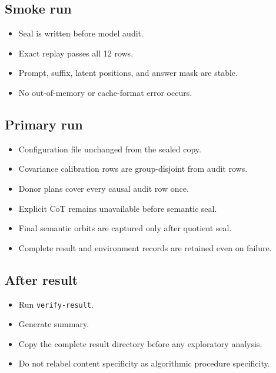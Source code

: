 \documentclass[
  10pt,
]{article}
\providecommand{\tightlist}{%
  \setlength{\itemsep}{0pt}\setlength{\parskip}{0pt}}
\begin{document}
\subsection{Smoke run}\label{smoke-run}

\begin{itemize}
\tightlist
\item[$\square$]
  Seal is written before model audit.
\item[$\square$]
  Exact replay passes all 12 rows.
\item[$\square$]
  Prompt, suffix, latent positions, and answer mask are stable.
\item[$\square$]
  No out-of-memory or cache-format error occurs.
\end{itemize}

\subsection{Primary run}\label{primary-run}

\begin{itemize}
\tightlist
\item[$\square$]
  Configuration file unchanged from the sealed copy.
\item[$\square$]
  Covariance calibration rows are group-disjoint from audit rows.
\item[$\square$]
  Donor plans cover every causal audit row once.
\item[$\square$]
  Explicit CoT remains unavailable before semantic seal.
\item[$\square$]
  Final semantic orbits are captured only after quotient seal.
\item[$\square$]
  Complete result and environment records are retained even on failure.
\end{itemize}

\subsection{After result}\label{after-result}

\begin{itemize}
\tightlist
\item[$\square$]
  Run \texttt{verify-result}.
\item[$\square$]
  Generate summary.
\item[$\square$]
  Copy the complete result directory before any exploratory analysis.
\item[$\square$]
  Do not relabel content specificity as algorithmic procedure
  specificity.
\end{itemize}
\end{document}

